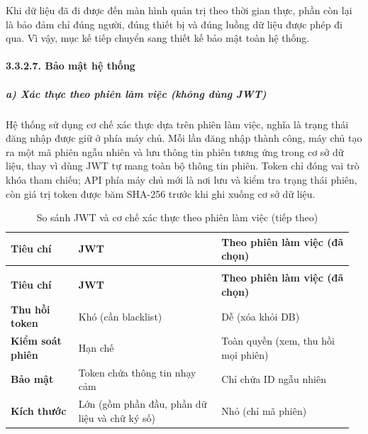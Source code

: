 \documentclass[a4paper]{extarticle}
\newcommand{\thesissettableid}[2]{%
  \renewcommand{\thetable}{#1}%
  \renewcommand{\theHtable}{#2}%
}
\begin{document}
Khi dữ liệu đã đi được đến màn hình quản trị theo thời gian thực, phần
còn lại là bảo đảm chỉ đúng người, đúng thiết bị và đúng luồng dữ liệu
được phép đi qua. Vì vậy, mục kế tiếp chuyển sang thiết kế bảo mật toàn
hệ thống.

\paragraph{3.3.2.7. Bảo mật hệ thống}\label{3237-bux1ea3o-mux1eadt-hux1ec7-thux1ed1ng-security-design}

\subparagraph{a) Xác thực theo phiên làm việc (không dùng
JWT)}\label{a-xuxe1c-thux1ef1c-session-based-khuxf4ng-duxf9ng-jwt}

Hệ thống sử dụng cơ chế xác thực dựa trên phiên làm việc, nghĩa là trạng
thái đăng nhập được giữ ở phía máy chủ. Mỗi lần đăng nhập thành công,
máy chủ tạo ra một mã phiên ngẫu nhiên và lưu thông tin phiên tương ứng
trong cơ sở dữ liệu, thay vì dùng JWT tự mang toàn bộ thông tin phiên.
Token chỉ đóng vai trò khóa tham chiếu; API phía máy chủ mới là nơi lưu
và kiểm tra trạng thái phiên, còn giá trị token được băm SHA-256 trước
khi ghi xuống cơ sở dữ liệu.


{\thesissettableid{3.23}{tab-ch3-so-sanh-jwt-va-session-based-authentication}
\def\LTcaptype{table}
\begin{longtable}{|L{0.190\linewidth}|L{0.403\linewidth}|L{0.372\linewidth}|}
\caption{So sánh JWT và cơ chế xác thực theo phiên làm việc}\label{tab:ch3-so-sanh-jwt-va-session-based-authentication}\\
\hline \textbf{Tiêu chí} & \textbf{JWT} & \textbf{Theo phiên làm việc (đã chọn)} \\
\hline
\endfirsthead
\caption[]{So sánh JWT và cơ chế xác thực theo phiên làm việc (tiếp theo)}\\
\hline \textbf{Tiêu chí} & \textbf{JWT} & \textbf{Theo phiên làm việc (đã chọn)} \\
\hline
\endhead
\hline
\endfoot
\endlastfoot
\textbf{Thu hồi token} & Khó (cần blacklist) & Dễ (xóa khỏi DB) \\\hline
\textbf{Kiểm soát phiên} & Hạn chế & Toàn quyền (xem, thu hồi mọi
phiên) \\\hline
\textbf{Bảo mật} & Token chứa thông tin nhạy cảm & Chỉ chứa ID ngẫu
nhiên \\\hline
\textbf{Kích thước} & Lớn (gồm phần đầu, phần dữ liệu và chữ ký số) & Nhỏ (chỉ
mã phiên) \\\hline
\end{longtable}
}
\end{document}
